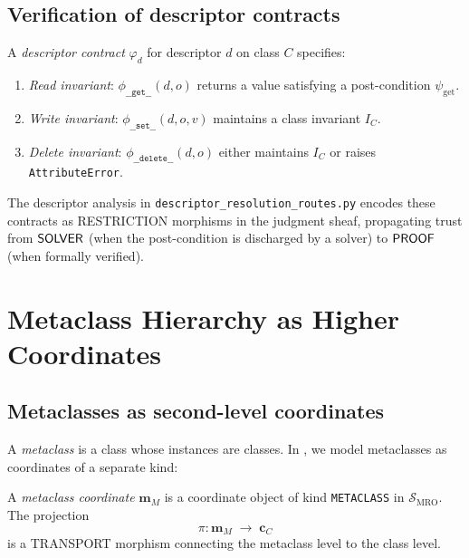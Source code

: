 \documentclass[11pt]{article}
\newcommand{\MROSite}{\mathcal{S}_{\mathrm{MRO}}} %
\newcommand{\ClassCoord}[1]{\mathbf{c}_{#1}}      %
\newcommand{\MetaCoord}[1]{\mathbf{m}_{#1}}       %
\newcommand{\Dget}{\texttt{\_\_get\_\_}}
\newcommand{\Dset}{\texttt{\_\_set\_\_}}
\newcommand{\Ddel}{\texttt{\_\_delete\_\_}}
\newcommand{\DescMor}[1]{\phi_{#1}}               %
\begin{document}
\subsection{Verification of descriptor contracts}

A \emph{descriptor contract} $\varphi_d$ for descriptor $d$ on class $C$
specifies:
\begin{enumerate}[leftmargin=1.5em,label=(\roman*)]
  \item \textit{Read invariant}: $\DescMor{\Dget}(d, o)$ returns a value
    satisfying a post-condition $\psi_{\mathrm{get}}$.
  \item \textit{Write invariant}: $\DescMor{\Dset}(d, o, v)$ maintains a
    class invariant $I_C$.
  \item \textit{Delete invariant}: $\DescMor{\Ddel}(d, o)$ either maintains
    $I_C$ or raises \texttt{AttributeError}.
\end{enumerate}

The \JuGeo{} descriptor analysis in
\texttt{descriptor\_resolution\_routes.py} encodes these contracts as
RESTRICTION morphisms in the judgment sheaf, propagating trust from
$\mathsf{SOLVER}$ (when the post-condition is discharged by a solver) to
$\mathsf{PROOF}$ (when formally verified).

\section{Metaclass Hierarchy as Higher Coordinates}\label{sec:meta}

\subsection{Metaclasses as second-level coordinates}

A \emph{metaclass} is a class whose instances are classes.  In \JuGeo{},
we model metaclasses as coordinates of a separate kind:

\begin{definition}\label{def:meta-coord}
  A \emph{metaclass coordinate} $\MetaCoord{M}$ is a coordinate object
  of kind \texttt{METACLASS} in $\MROSite$.  The projection
  \[
    \pi\colon \MetaCoord{M} \;\longrightarrow\; \ClassCoord{C}
  \]
  is a TRANSPORT morphism connecting the metaclass level to the class level.
\end{definition}
\end{document}
